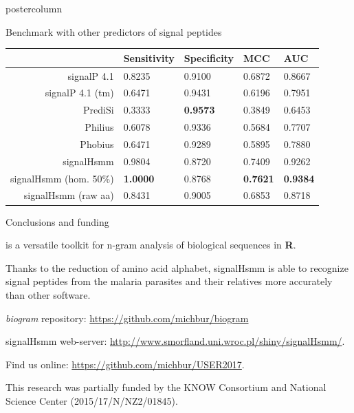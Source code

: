 \documentclass[final]{beamer}\usepackage[]{graphicx}\usepackage[]{color}
\begin{document}
\begin{frame}
\begin{columns}
\begin{column}{.50\textwidth}
\begin{beamercolorbox}[center,wd=\textwidth]{postercolumn}
\begin{minipage}[T]{.95\textwidth}
{\begin{block}{Benchmark with other predictors of signal peptides}
    \begin{table}[ht]
\centering
\begin{tabular}{rllll}
  \toprule
 & Sensitivity & Specificity & MCC & AUC \\ 
  \midrule
signalP 4.1 \citep{petersen_signalp_2011} & 0.8235 & 0.9100 & 0.6872 & 0.8667 \\ 
   \rowcolor{white}signalP 4.1 (tm) \citep{petersen_signalp_2011} & 0.6471 & 0.9431 & 0.6196 & 0.7951 \\ 
   PrediSi \citep{hiller_predisi:_2004} & 0.3333 & \textbf{0.9573} & 0.3849 & 0.6453 \\ 
   \rowcolor{white}Philius \citep{reynolds_transmembrane_2008} & 0.6078 & 0.9336 & 0.5684 & 0.7707 \\ 
  Phobius \citep{kall_combined_2004} & 0.6471 & 0.9289 & 0.5895 & 0.7880 \\ 
   \rowcolor{white}signalHsmm & 0.9804 & 0.8720 & 0.7409 & 0.9262 \\ 
  signalHsmm (hom. 50\%) & \textbf{1.0000} & 0.8768 & \textbf{0.7621} & \textbf{0.9384} \\ 
   \rowcolor{white}signalHsmm (raw aa) & 0.8431 & 0.9005 & 0.6853 & 0.8718 \\ 
   \bottomrule
\end{tabular}
\end{table}
    \end{block}
    \vfill
     
    \begin{block}{Conclusions and funding}
    
    
     is a versatile toolkit for n-gram analysis of biological sequences in \textbf{R}.
    
    \bigskip
    
      Thanks to the reduction of amino acid alphabet, signalHsmm is able 
      to recognize signal peptides from the malaria parasites and their 
relatives more accurately than other software. 

\bigskip

\textit{biogram} repository: \url{https://github.com/michbur/biogram}

\bigskip

signalHsmm web-server: \url{http://www.smorfland.uni.wroc.pl/shiny/signalHsmm/}. 

\bigskip

Find us online: \url{https://github.com/michbur/USER2017}.      

\small{This research was partially funded by the KNOW Consortium and National Science Center (2015/17/N/NZ2/01845).}


\end{block}}
\end{minipage}
\end{beamercolorbox}
\end{column}
\end{columns}
\end{frame}
\end{document}
